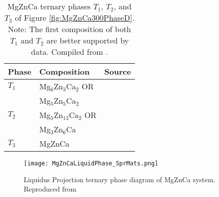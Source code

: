 \documentclass[a4paper,12pt,oneside]{report}%
\begin{document}
\begin{table}[H]
	\centering
	\begin{tabular}{ l l l }
		\toprule
		Phase & Composition & Source \\
		\midrule
		$T_{1}$ & Mg$_{6}$Zn$_{3}$Ca$_{2}$ OR & \cite{Clark1961} \\
		& Mg$_{5}$Zn$_{5}$Ca$_{2}$ & \\
		$T_{2}$	& Mg$_{5}$Zn$_{13}$Ca$_{2}$ OR & \cite{Clark1961} \\
		& Mg$_{3}$Zn$_{6}$Ca & \\
		$T_{3}$	& MgZnCa & \cite{Schulze1961} \\
		\bottomrule
	\end{tabular}
	\caption[MgZnCa ternary phases $T_{1}$, $T_{2}$, and $T_{3}$ of Figure \ref{fig:MgZnCa300PhaseD}. Note: The first composition of both $T_{1}$ and $T_{2}$ are better supported by data.]{MgZnCa ternary phases $T_{1}$, $T_{2}$, and $T_{3}$ of Figure \ref{fig:MgZnCa300PhaseD}. Note: The first composition of both $T_{1}$ and $T_{2}$ are better supported by data. Compiled from \cite{Clark1961, Schulze1961}.}
	\label{tab:SputterParameters}
\end{table}

\begin{figure}[htbp]
	\centering
	\texttt{[image: MgZnCaLiquidPhase\_SprMats.png]}
	\caption[Liquidus Projection ternary phase diagram of MgZnCa system.]{Liquidus Projection ternary phase diagram of MgZnCa system. Reproduced from \cite{Paris1933}}
	\label{fig:MgZnCaLiquidPhaseD}
\end{figure}
\end{document}
